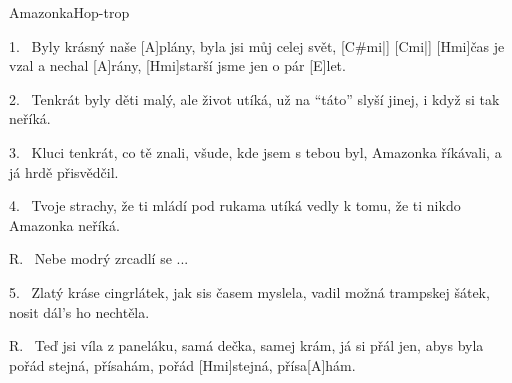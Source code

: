 \pagestyle{empty}

\begin{song}{Amazonka}{Hop-trop}

\begin{xverse}{1.~}
Byly krásný naše [A]plány,
byla jsi můj celej svět, [C#mi|]{} [Cmi|]{}
[Hmi]{}čas je vzal a nechal [A]rány,
[Hmi]starší jsme jen o pár [E]let.
\end{xverse}

\begin{xverse}{2.~}
Tenkrát byly děti malý, ale život utíká,
už na ``táto'' slyší jinej, i když si tak neříká.
\end{xverse}


\begin{xverse}{3.~}
Kluci tenkrát, co tě znali,  všude, kde jsem s tebou byl,
Amazonka říkávali, a já hrdě přisvědčil.
\end{xverse}

\begin{xverse}{4.~}
Tvoje strachy, že ti mládí pod rukama utíká
vedly k tomu, že ti nikdo Amazonka neříká.
\end{xverse}

\begin{xverse}{R.~}
Nebe modrý zrcadlí se ...
\end{xverse}

\begin{xverse}{5.~}
Zlatý kráse cingrlátek, jak sis časem myslela,
vadil možná trampskej šátek, nosit dál's ho nechtěla.
\end{xverse}

\begin{xverse}{R.~}
Teď jsi víla z paneláku, samá dečka, samej krám,
já si přál jen, abys byla pořád stejná, přísahám,
pořád [Hmi]stejná, přísa[A]hám.
\end{xverse}

\end{song}

\setcounter{page}{1}


